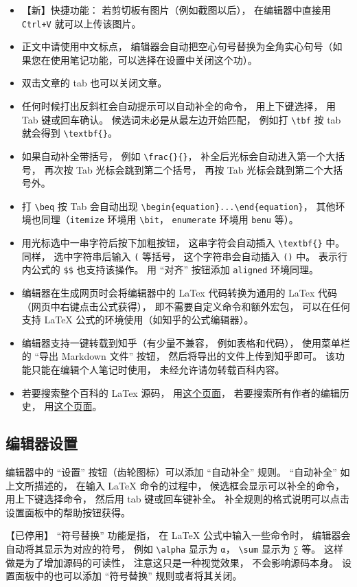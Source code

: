 \begin{itemize}
\item 【新】快捷功能： 若剪切板有图片（例如截图以后）， 在编辑器中直接用 \verb|Ctrl+V| 就可以上传该图片。
\item 正文中请使用中文标点， 编辑器会自动把空心句号替换为全角实心句号（如果您在使用笔记功能，可以选择在设置中关闭这个功）。
\item 双击文章的 tab 也可以关闭文章。
\item 任何时候打出反斜杠会自动提示可以自动补全的命令， 用上下键选择， 用 Tab 键或回车确认。 候选词未必是从最左边开始匹配， 例如打 \verb|\tbf| 按 tab 就会得到 \verb|\textbf{}|。
\item 如果自动补全带括号， 例如 \verb|\frac{}{}|， 补全后光标会自动进入第一个大括号， 再次按 Tab 光标会跳到第二个括号， 再按 Tab 光标会跳到第二个大括号外。
\item 打 \verb|\beq| 按 Tab 会自动出现 \verb|\begin{equation}...\end{equation}|， 其他环境也同理（\verb`itemize` 环境用 \verb`\bit`， \verb`enumerate` 环境用 \verb`benu` 等）。
\item 用光标选中一串字符后按下加粗按钮， 这串字符会自动插入 \verb|\textbf{}| 中。 同样， 选中字符串后输入 \verb|(| 等括号， 这个字符串会自动插入 \verb|()| 中。 表示行内公式的 \verb|$$| 也支持该操作。 用 “对齐” 按钮添加 \verb|aligned| 环境同理。
\item 编辑器在生成网页时会将编辑器中的 LaTex 代码转换为通用的 LaTex 代码（网页中右键点击公式获得）， 即不需要自定义命令和额外宏包， 可以在任何支持 LaTeX 公式的环境使用（如知乎的公式编辑器）。
\item 编辑器支持一键转载到知乎（有少量不兼容， 例如表格和代码）， 使用菜单栏的 “导出 Markdown 文件” 按钮， 然后将导出的文件上传到知乎即可。 该功能只能在编辑个人笔记时使用， 未经允许请勿转载百科内容。
\item 若要搜索整个百科的 LaTex 源码， 用\href{https://github.com/MacroUniverse/PhysWiki-log/tree/master/contents}{这个页面}， 若要搜索所有作者的编辑历史， 用\href{https://github.com/MacroUniverse/PhysWiki-backup}{这个页面}。
\end{itemize}

\subsection{编辑器设置}
编辑器中的 “设置” 按钮（齿轮图标）可以添加 “自动补全” 规则。 “自动补全” 如上文所描述的， 在输入 LaTeX 命令的过程中， 候选框会显示可以补全的命令， 用上下键选择命令， 然后用 tab 键或回车键补全。 补全规则的格式说明可以点击设置面板中的帮助按钮获得。

【已停用】 “符号替换” 功能是指， 在 LaTeX 公式中输入一些命令时， 编辑器会自动将其显示为对应的符号， 例如 \verb|\alpha| 显示为 \lstinline|α|， \verb|\sum| 显示为 \lstinline|∑| 等。 这样做是为了增加源码的可读性， 注意这只是一种视觉效果， 不会影响源码本身。 设置面板中的也可以添加 “符号替换” 规则或者将其关闭。

